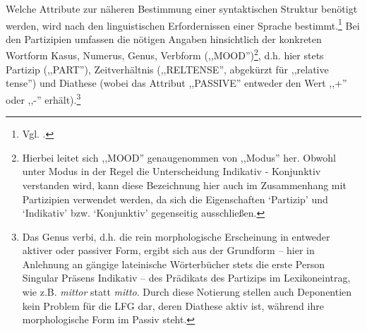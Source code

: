 \documentclass[12pt,a4paper]{article}
\begin{document}
Welche Attribute zur näheren Bestimmung einer syntaktischen Struktur benötigt werden, wird nach den linguistischen Erfordernissen einer Sprache bestimmt.\footnote{Vgl. \cite[8]{Skript}.} Bei den Partizipien umfassen die nötigen Angaben hinsichtlich der konkreten Wortform Kasus, Numerus, Genus, Verbform (,,MOOD'')\footnote{Hierbei leitet sich ,,MOOD'' genaugenommen von ,,Modus'' her. Obwohl unter Modus in der Regel die Unterscheidung Indikativ - Konjunktiv verstanden wird, kann diese Bezeichnung hier auch im Zusammenhang mit Partizipien verwendet werden, da sich die Eigenschaften `Partizip' und `Indikativ' bzw. `Konjunktiv' gegenseitig ausschließen.}, d.h. hier stets Partizip (,,PART''), Zeitverhältnis (,,RELTENSE'', abgekürzt für ,,relative tense'') und Diathese (wobei das Attribut ,,PASSIVE'' entweder den Wert ,,+'' oder ,,-'' erhält).\footnote{Das Genus verbi, d.h. die rein morphologische Erscheinung in entweder aktiver oder passiver Form, ergibt sich aus der Grundform -- hier in Anlehnung an gängige lateinische Wörterbücher stets die erste Person Singular Präsens Indikativ -- des Prädikats des Partizips im Lexikoneintrag, wie z.B. \textit{mittor} statt \textit{mitto}. Durch diese Notierung stellen auch Deponentien kein Problem für die LFG dar, deren Diathese aktiv ist, während ihre morphologische Form im Passiv steht.}

\end{document}

